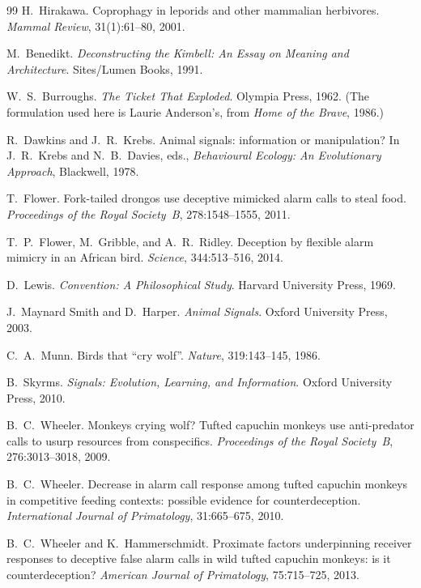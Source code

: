 \begin{thebibliography}{99}
H.~Hirakawa. \newblock Coprophagy in leporids and other mammalian herbivores. \newblock \emph{Mammal Review}, 31(1):61--80, 2001.

M.~Benedikt. \newblock \emph{Deconstructing the Kimbell: An Essay on Meaning and Architecture}. \newblock Sites/Lumen Books, 1991.

W.~S.~Burroughs. \newblock \emph{The Ticket That Exploded}. \newblock Olympia Press, 1962. \newblock (The formulation used here is Laurie Anderson's, from \emph{Home of the Brave}, 1986.)

R.~Dawkins and J.~R.~Krebs. \newblock Animal signals: information or manipulation? \newblock In J.~R.~Krebs and N.~B.~Davies, eds., \emph{Behavioural Ecology: An Evolutionary Approach}, Blackwell, 1978.

T.~Flower. \newblock Fork-tailed drongos use deceptive mimicked alarm calls to steal food. \newblock \emph{Proceedings of the Royal Society~B}, 278:1548--1555, 2011.

T.~P.~Flower, M.~Gribble, and A.~R.~Ridley. \newblock Deception by flexible alarm mimicry in an African bird. \newblock \emph{Science}, 344:513--516, 2014.

D.~Lewis. \newblock \emph{Convention: A Philosophical Study}. \newblock Harvard University Press, 1969.

J.~Maynard Smith and D.~Harper. \newblock \emph{Animal Signals}. \newblock Oxford University Press, 2003.

C.~A.~Munn. \newblock Birds that ``cry wolf''. \newblock \emph{Nature}, 319:143--145, 1986.

B.~Skyrms. \newblock \emph{Signals: Evolution, Learning, and Information}. \newblock Oxford University Press, 2010.

B.~C.~Wheeler. \newblock Monkeys crying wolf? Tufted capuchin monkeys use anti-predator calls to usurp resources from conspecifics. \newblock \emph{Proceedings of the Royal Society~B}, 276:3013--3018, 2009.

B.~C.~Wheeler. \newblock Decrease in alarm call response among tufted capuchin monkeys in competitive feeding contexts: possible evidence for counterdeception. \newblock \emph{International Journal of Primatology}, 31:665--675, 2010.

B.~C.~Wheeler and K.~Hammerschmidt. \newblock Proximate factors underpinning receiver responses to deceptive false alarm calls in wild tufted capuchin monkeys: is it counterdeception? \newblock \emph{American Journal of Primatology}, 75:715--725, 2013.

\end{thebibliography}

